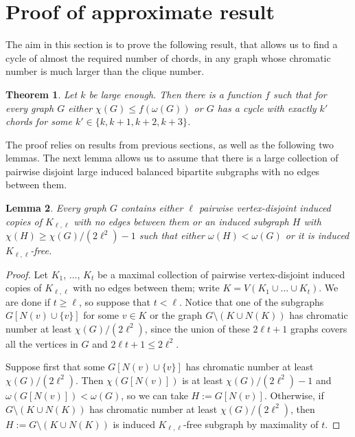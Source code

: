 \documentclass[11pt,english]{article}
\theoremstyle{plain}
\newtheorem{thm}{Theorem}[section]
\newtheorem{lem}[thm]{Lemma}
\theoremstyle{definition}
\theoremstyle{remark}
\begin{document}
\section{Proof of approximate result} \label{sec:approximate}
    
    The aim in this section is to prove the following result, that allows us to find a cycle of almost the required number of chords, in any graph whose chromatic number is much larger than the clique number. 
    
    \begin{thm} \label{thm:main-almost}
        Let $k$ be large enough. Then there is a function $f$ such that for every graph $G$ either $\chi(G) \le f(\omega(G))$ or $G$ has a cycle with exactly $k'$ chords for some $k' \in \{k, k+1, k+2, k+3\}$.
    \end{thm}
    
    The proof relies on results from previous sections, as well as the following two lemmas. 
    The next lemma allows us to assume that there is a large collection of pairwise disjoint large induced balanced bipartite subgraphs with no edges between them.
    
    \begin{lem} \label{lem:find-disjoint-complete-bip}
    	Every graph $G$ contains either $\ell$ pairwise vertex-disjoint induced copies of $K_{\ell, \ell}$ with no edges between them or an induced subgraph $H$ with $\chi(H)\geq \chi(G)/(2\ell^2)-1$ such that either $\omega(H) < \omega(G)$ or it is induced $K_{\ell, \ell}$-free.
    \end{lem}
    
    \begin{proof}
        Let $K_1$, $\ldots$, $K_t$ be a maximal collection of pairwise vertex-disjoint induced copies of $K_{\ell, \ell}$ with no edges between them; write $K = V(K_1 \cup \ldots \cup K_t)$. We are done if $t \ge \ell$, so suppose that $t< \ell$. 
        Notice that one of the subgraphs $G[N(v)\cup \{v\}]$ for some $v \in  K$ or the graph $G \setminus (K \cup N(K))$ has chromatic number at least $\chi(G)/(2\ell^2)$, since the union of these $2\ell t+1$ graphs covers all the vertices in $G$ and $2\ell t + 1 \le 2\ell^2$.
    
        Suppose first that some $G[N(v)\cup\{v\}]$ has chromatic number at least $\chi(G)/(2\ell^2)$.
        Then $\chi(G[N(v)])$ is at least $\chi(G)/(2\ell^2)-1$ and $\omega(G[N(v)])<\omega(G)$, so we can take $H:=G[N(v)]$.
        Otherwise, if $G \setminus (K \cup N(K))$ has chromatic number at least $\chi(G)/(2\ell^2)$, then $H:=G \setminus (K \cup N(K))$ is induced $K_{\ell,\ell}$-free subgraph by maximality of $t$. 
    \end{proof}
    
\end{document}

